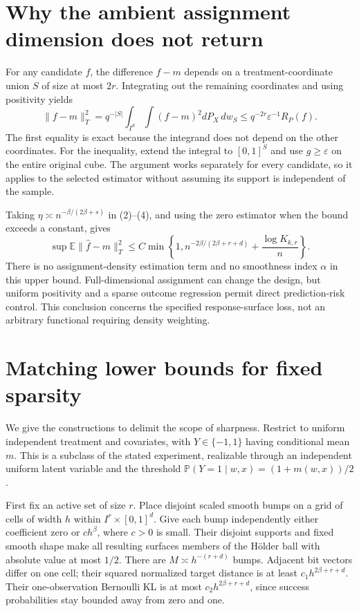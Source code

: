 \documentclass[11pt,a4paper]{article}
\newcommand{\E}{\mathbb E}
\newcommand{\Prb}{\mathbb P}
\begin{document}
\section{Why the ambient assignment dimension does not return}
For any candidate $f$, the difference $f-m$ depends on a treatment-coordinate union $S$ of size at most $2r$. Integrating out the remaining coordinates and using positivity yields
\[
 \|f-m\|_T^2
 =q^{-|S|}\int_{I^S}\int(f-m)^2dP_X\,dw_S
 \le q^{-2r}\varepsilon^{-1}R_P(f). \tag{4}
\]
The first equality is exact because the integrand does not depend on the other coordinates. For the inequality, extend the integral to $[0,1]^S$ and use $g\ge\varepsilon$ on the entire original cube. The argument works separately for every candidate, so it applies to the selected estimator without assuming its support is independent of the sample.

Taking $\eta\asymp n^{-\beta/(2\beta+s)}$ in (2)--(4), and using the zero estimator when the bound exceeds a constant, gives
\[
 \sup\E\|\widehat f-m\|_T^2
 \le C\min\left\{1, n^{-2\beta/(2\beta+r+d)}+
                         \frac{\log K_{k,r}}n\right\}. \tag{5}
\]
There is no assignment-density estimation term and no smoothness index $\alpha$ in this upper bound. Full-dimensional assignment can change the design, but uniform positivity and a sparse outcome regression permit direct prediction-risk control. This conclusion concerns the specified response-surface loss, not an arbitrary functional requiring density weighting.

\section{Matching lower bounds for fixed sparsity}
We give the constructions to delimit the scope of sharpness. Restrict to uniform independent treatment and covariates, with $Y\in\{-1,1\}$ having conditional mean $m$. This is a subclass of the stated experiment, realizable through an independent uniform latent variable and the threshold $\Prb(Y=1\mid w,x)=(1+m(w,x))/2$.

First fix an active set of size $r$. Place disjoint scaled smooth bumps on a grid of cells of width $h$ within $I^r\times[0,1]^d$. Give each bump independently either coefficient zero or $c h^\beta$, where $c>0$ is small. Their disjoint supports and fixed smooth shape make all resulting surfaces members of the H\"older ball with absolute value at most $1/2$. There are $M\asymp h^{-(r+d)}$ bumps. Adjacent bit vectors differ on one cell; their squared normalized target distance is at least $c_1h^{2\beta+r+d}$. Their one-observation Bernoulli KL is at most $c_2h^{2\beta+r+d}$, since success probabilities stay bounded away from zero and one.
\end{document}
